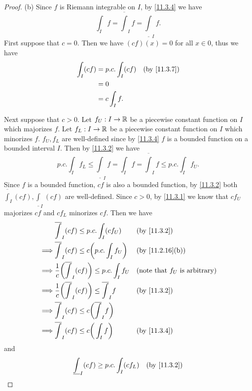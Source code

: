 \begin{proof}{(b)}
  Since \(f\) is Riemann integrable on \(I\), by \cref{11.3.4} we have
  \[
    \int_I f = \overline{\int}_I f = \underline{\int}_I f.
  \]
  First suppose that \(c = 0\).
  Then we have \((cf)(x) = 0\) for all \(x \in 0\), thus we have
  \begin{align*}
    \int_I (cf) & = p.c. \int_I (cf) &  & \by{11.3.7} \\
                & = 0                                 \\
                & = c \int_I f.
  \end{align*}

  Next suppose that \(c > 0\).
  Let \(f_U : I \to \mathbb{R}\) be a piecewise constant function on \(I\) which majorizes \(f\).
  Let \(f_L : I \to \mathbb{R}\) be a piecewise constant function on \(I\) which minorizes \(f\).
  \(f_U, f_L\) are well-defined since by \cref{11.3.4} \(f\) is a bounded function on a bounded interval \(I\).
  Then by \cref{11.3.2} we have
  \[
    p.c. \int_I f_L \leq \underline{\int}_I f = \int_I f = \overline{\int}_I f \leq p.c. \int_I f_U.
  \]
  Since \(f\) is a bounded function, \(cf\) is also a bounded function, by \cref{11.3.2} both \(\overline{\int}_I (cf), \underline{\int}_I (cf)\) are well-defined.
  Since \(c > 0\), by \cref{11.3.1} we know that \(c f_U\) majorizes \(c f\) and \(c f_L\) minorizes \(c f\).
  Then we have
  \begin{align*}
             & \overline{\int}_I (cf) \leq p.c. \int_I (c f_U)                          &  & \by{11.3.2}                             \\
    \implies & \overline{\int}_I (cf) \leq c \bigg(p.c. \int_I f_U\bigg)                &  & \by{11.2.16}[b]                         \\
    \implies & \dfrac{1}{c} \bigg(\overline{\int}_I (cf)\bigg) \leq p.c. \int_I f_U     &  & \text{(note that \(f_U\) is arbitrary)} \\
    \implies & \dfrac{1}{c} \bigg(\overline{\int}_I (cf)\bigg) \leq \overline{\int}_I f &  & \by{11.3.2}                             \\
    \implies & \overline{\int}_I (cf) \leq c\bigg(\overline{\int}_I f\bigg)                                                          \\
    \implies & \overline{\int}_I (cf) \leq c\bigg(\int_I f\bigg)                        &  & \by{11.3.4}
  \end{align*}
  and
  \begin{align*}
             & \underline{\int}_I (cf) \geq p.c. \int_I (c f_L)                           &  & \by{11.3.2}                             \\

\end{align*}
\end{proof}
